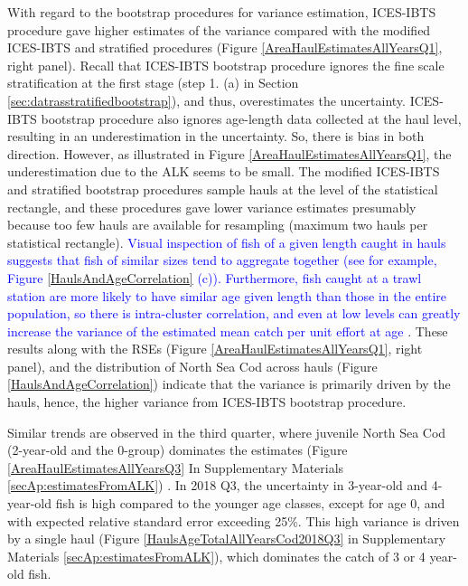 \documentclass[a4paper 12pt]{article}
\numberwithin{equation}{section}
\newcommand{\nat}[1]{\textcolor{blue}{#1}}
\begin{document}
 With regard to the bootstrap procedures for variance estimation, ICES-IBTS procedure gave higher estimates of the variance compared with the modified ICES-IBTS and stratified procedures (Figure \ref{AreaHaulEstimatesAllYearsQ1}, right panel). Recall that  ICES-IBTS bootstrap  procedure ignores the fine scale stratification at the first stage (step 1. (a)  in Section \ref{sec:datrasstratifiedbootstrap}), and thus, overestimates the uncertainty. ICES-IBTS bootstrap procedure also ignores age-length data collected at the haul level, resulting in an underestimation in the uncertainty. So, there is bias in both direction. However, as illustrated in Figure  \ref{AreaHaulEstimatesAllYearsQ1}, the underestimation due to the ALK seems to be small. The modified ICES-IBTS and stratified bootstrap procedures sample hauls at the level of the statistical rectangle, and these procedures gave lower variance estimates presumably because too few hauls are available for resampling (maximum two hauls per statistical rectangle). \nat{Visual inspection of fish of a given length caught in hauls suggests that fish of similar sizes tend to aggregate together (see for example, Figure \ref{HaulsAndAgeCorrelation} (c)). Furthermore, fish caught at a trawl station are more likely to have similar age given length than those in the entire population,  so there is intra-cluster correlation, and even at low levels can greatly increase the variance of the estimated mean catch per unit effort at age \citep{pennington1994assessing}}. These results along with the RSEs (Figure \ref{AreaHaulEstimatesAllYearsQ1}, right panel), and  the distribution of North Sea Cod across hauls (Figure \ref{HaulsAndAgeCorrelation}) indicate that the variance is primarily driven by the hauls, hence, the higher variance from ICES-IBTS bootstrap procedure.
 
Similar trends are observed in the third quarter, where juvenile North Sea Cod (2-year-old and the 0-group) dominates the estimates (Figure \ref{AreaHaulEstimatesAllYearsQ3} In Supplementary Materials \ref{secAp:estimatesFromALK}) . In 2018 Q3, the uncertainty in 3-year-old and 4-year-old fish is high compared to the younger age classes, except for age 0, and with expected relative standard error exceeding 25\%. This high variance is driven by a single haul (Figure \ref{HaulsAgeTotalAllYearsCod2018Q3} in Supplementary Materials \ref{secAp:estimatesFromALK}), which dominates the catch of 3 or 4 year-old fish.  \\
\end{document}
